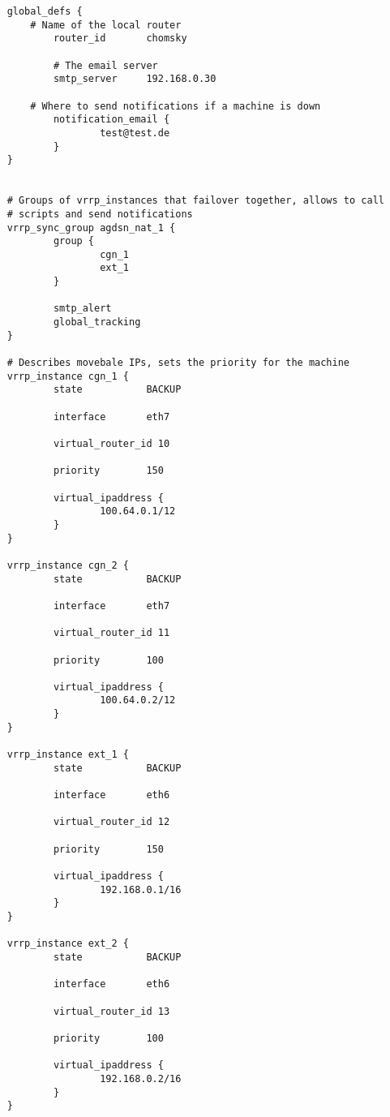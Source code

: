 \begin{verbatim}
    global_defs {
        # Name of the local router
            router_id       chomsky

            # The email server
            smtp_server     192.168.0.30

        # Where to send notifications if a machine is down
            notification_email {
                    test@test.de
            }
    }


    # Groups of vrrp_instances that failover together, allows to call
    # scripts and send notifications 
    vrrp_sync_group agdsn_nat_1 {
            group {
                    cgn_1
                    ext_1
            }

            smtp_alert
            global_tracking
    }

    # Describes movebale IPs, sets the priority for the machine
    vrrp_instance cgn_1 {
            state           BACKUP

            interface       eth7

            virtual_router_id 10

            priority        150

            virtual_ipaddress {
                    100.64.0.1/12
            }
    }

    vrrp_instance cgn_2 {
            state           BACKUP

            interface       eth7

            virtual_router_id 11

            priority        100

            virtual_ipaddress {
                    100.64.0.2/12
            }
    }

    vrrp_instance ext_1 {
            state           BACKUP

            interface       eth6

            virtual_router_id 12

            priority        150

            virtual_ipaddress {
                    192.168.0.1/16
            }
    }

    vrrp_instance ext_2 {
            state           BACKUP

            interface       eth6

            virtual_router_id 13

            priority        100

            virtual_ipaddress {
                    192.168.0.2/16
            }
    }
\end{verbatim}

